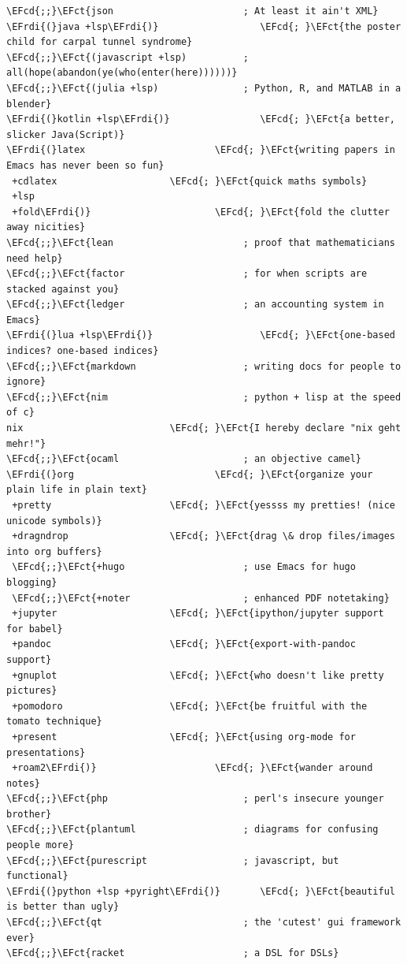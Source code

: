 \documentclass{scrartcl}
\newcommand{\EFct}[1]{\textcolor{EFct}{#1}} %
\newcommand{\EFcd}[1]{\textcolor{EFcd}{#1}} %
\newcommand{\EFrdi}[1]{\textcolor{EFrdi}{#1}} %
\begin{document}
\begin{enumerate}
\begin{Code}
\begin{Verbatim}[]
\EFcd{;;}\EFct{json                       ; At least it ain't XML}
\EFrdi{(}java +lsp\EFrdi{)}                  \EFcd{; }\EFct{the poster child for carpal tunnel syndrome}
\EFcd{;;}\EFct{(javascript +lsp)          ; all(hope(abandon(ye(who(enter(here))))))}
\EFcd{;;}\EFct{(julia +lsp)               ; Python, R, and MATLAB in a blender}
\EFrdi{(}kotlin +lsp\EFrdi{)}                \EFcd{; }\EFct{a better, slicker Java(Script)}
\EFrdi{(}latex                       \EFcd{; }\EFct{writing papers in Emacs has never been so fun}
 +cdlatex                    \EFcd{; }\EFct{quick maths symbols}
 +lsp
 +fold\EFrdi{)}                      \EFcd{; }\EFct{fold the clutter away nicities}
\EFcd{;;}\EFct{lean                       ; proof that mathematicians need help}
\EFcd{;;}\EFct{factor                     ; for when scripts are stacked against you}
\EFcd{;;}\EFct{ledger                     ; an accounting system in Emacs}
\EFrdi{(}lua +lsp\EFrdi{)}                   \EFcd{; }\EFct{one-based indices? one-based indices}
\EFcd{;;}\EFct{markdown                   ; writing docs for people to ignore}
\EFcd{;;}\EFct{nim                        ; python + lisp at the speed of c}
nix                          \EFcd{; }\EFct{I hereby declare "nix geht mehr!"}
\EFcd{;;}\EFct{ocaml                      ; an objective camel}
\EFrdi{(}org                         \EFcd{; }\EFct{organize your plain life in plain text}
 +pretty                     \EFcd{; }\EFct{yessss my pretties! (nice unicode symbols)}
 +dragndrop                  \EFcd{; }\EFct{drag \& drop files/images into org buffers}
 \EFcd{;;}\EFct{+hugo                     ; use Emacs for hugo blogging}
 \EFcd{;;}\EFct{+noter                    ; enhanced PDF notetaking}
 +jupyter                    \EFcd{; }\EFct{ipython/jupyter support for babel}
 +pandoc                     \EFcd{; }\EFct{export-with-pandoc support}
 +gnuplot                    \EFcd{; }\EFct{who doesn't like pretty pictures}
 +pomodoro                   \EFcd{; }\EFct{be fruitful with the tomato technique}
 +present                    \EFcd{; }\EFct{using org-mode for presentations}
 +roam2\EFrdi{)}                     \EFcd{; }\EFct{wander around notes}
\EFcd{;;}\EFct{php                        ; perl's insecure younger brother}
\EFcd{;;}\EFct{plantuml                   ; diagrams for confusing people more}
\EFcd{;;}\EFct{purescript                 ; javascript, but functional}
\EFrdi{(}python +lsp +pyright\EFrdi{)}       \EFcd{; }\EFct{beautiful is better than ugly}
\EFcd{;;}\EFct{qt                         ; the 'cutest' gui framework ever}
\EFcd{;;}\EFct{racket                     ; a DSL for DSLs}

\end{Verbatim}
\end{Code}
\end{enumerate}
\end{document}
